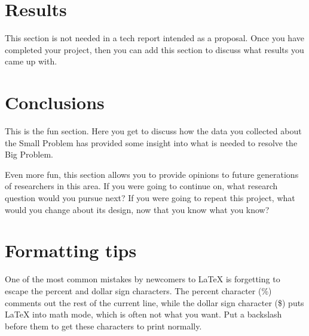 \documentclass[english]{proposalnsf}
\begin{document}
\section{Results}
\label{results}

This section is not needed in a tech report intended as a proposal.  Once you have completed your project, then you can add this section to discuss what results you came up with.

\section{Conclusions}
\label{conclusions}

This is the fun section. Here you get to discuss how the data you collected about the Small Problem has provided some insight into what is needed to resolve the Big Problem.

Even more fun, this section allows you to provide opinions to future generations of researchers in this area. If you were going to continue on, what research question would you pursue next?  If you were going to repeat this project, what would you change about its design, now that you know what you know?





\appendix
\section{Formatting tips}

One of the most common mistakes by newcomers to LaTeX is forgetting to escape the percent and dollar sign characters. The percent character (\%) comments out the rest of the current line, while the dollar sign character (\$) puts LaTeX into math mode, which is often not what you want. Put a backslash before them to get these characters to print normally.
\end{document}
